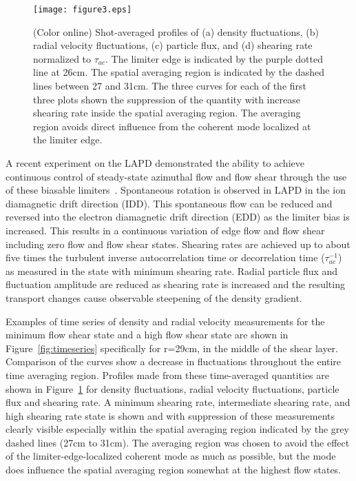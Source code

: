 \documentclass[aip,pop,amsmath,amssymb,preprint,superscriptaddress]{revtex4-1} %
\begin{document}
\begin{figure}[!htbp]
\centerline{
\texttt{[image: figure3.eps]}}
\caption{\label{fig:profiles} (Color online) Shot-averaged profiles of (a) density fluctuations, (b) radial velocity fluctuations, (c) particle flux, and (d) shearing rate normalized to $\tau_{ac}$. The limiter edge is indicated by the purple dotted line at 26cm. The spatial averaging region is indicated by the dashed lines between 27 and 31cm. The three curves for each of the first three plots shown the suppression of the quantity with increase shearing rate inside the spatial averaging region. The averaging region avoids direct influence from the coherent mode localized at the limiter edge.}
\end{figure}

A recent experiment on the LAPD demonstrated the ability to achieve
continuous control of steady-state azimuthal flow and flow shear
through the use of these biasable
limiters~\cite{schaffner12}. Spontaneous rotation is observed in LAPD
in the ion diamagnetic drift direction (IDD).  This spontaneous flow can be
reduced and reversed into the electron diamagnetic drift direction (EDD) as the
limiter bias is increased. This results in a continuous variation of
edge flow and flow shear including zero flow and flow shear
states. Shearing rates are achieved up to about five times the
turbulent inverse autocorrelation time or decorrelation time
($\tau_{ac}^{-1}$) as measured
in the state with minimum shearing rate. Radial particle flux and
fluctuation amplitude are reduced as shearing rate is increased and
the resulting transport changes cause observable steepening of the
density gradient.

Examples of time series of density and radial velocity measurements for the minimum flow shear state and a high flow shear state are shown in Figure~\ref{fig:timeseries} specifically for r=29cm, in the middle of the shear layer. Comparison of the curves show a decrease in fluctuations throughout the entire time averaging region. Profiles made from these time-averaged quantities are shown in Figure~\ref{fig:profiles} for density fluctuations, radial velocity fluctuations, particle flux and shearing rate. A minimum shearing rate, intermediate shearing rate, and high shearing rate state is shown and with suppression of these measurements clearly visible especially within the spatial averaging region indicated by the grey dashed lines (27cm to 31cm). The averaging region was chosen to avoid the effect of the limiter-edge-localized coherent mode as much as possible, but the mode does influence the spatial averaging region somewhat at the highest flow states.
\end{document}
